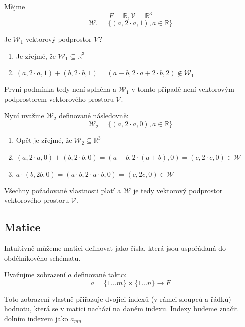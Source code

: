 \begin{example}
    Mějme
    $$F = \mathbb{R}, \mathcal{V} = \mathbb{R}^3$$
    $$\mathcal{W}_1 = \{(a, 2\cdot a, 1), a \in \mathbb{R}\}$$

    Je $\mathcal{W}_1$ vektorový podprostor $\mathcal{V}$?
    \begin{enumerate}[start=0]
        \item Je zřejmé, že $\mathcal{W}_1 \subseteq \mathbb{R}^3$
        \item $(a, 2 \cdot a, 1) + (b, 2 \cdot b, 1) = (a + b, 2 \cdot a + 2 \cdot b, 2)
        \notin \mathcal{W}_1$
    \end{enumerate}
    První podmínka tedy není splněna a $\mathcal{W}_1$ v tomto případě není vektorovým podprostorem
    vektorového prostoru $\mathcal{V}$.

    Nyní uvažme $\mathcal{W}_2$ definované následovně:
    $$\mathcal{W}_2 = \{(a, 2\cdot a, 0), a \in \mathbb{R}\}$$
    \begin{enumerate}[start=0]
        \item Opět je zřejmé, že $\mathcal{W}_2 \subseteq \mathbb{R}^3$
        \item $(a, 2 \cdot a, 0) + (b, 2 \cdot b, 0) = (a + b, 2 \cdot (a + b), 0) = (c, 2 \cdot c, 0) \in \mathcal{W}$
        \item $a \cdot (b, 2b, 0) = (a \cdot b, 2\cdot a \cdot b, 0) = (c, 2c, 0) \in \mathcal{W}$
    \end{enumerate}
    Všechny požadované vlastnosti platí a $\mathcal{W}$ je tedy vektorový podprostor vektorového
    prostoru $\mathcal{V}$.
\end{example}

\subsection{Matice}

Intuitivně můžeme matici definovat jako čísla, která jsou uspořádaná do obdélníkového schématu.

\begin{definition}[Matice]
    Uvažujme zobrazení $a$ definované takto:
    $$a = \{1 \ldots m\} \times \{1 \ldots n\} \rightarrow F$$

    Toto zobrazení vlastně přiřazuje dvojici indexů (v rámci sloupců a řádků) hodnotu,
    která se v matici nachází na daném indexu. Indexy budeme značit dolním indexem
    jako $a_{mn}$
\end{definition}

